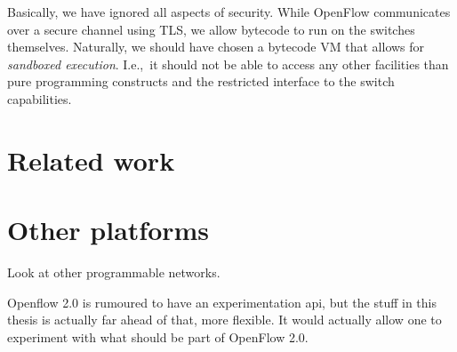 Basically, we have ignored all aspects of security.  While OpenFlow
communicates over a secure channel using \ac{TLS}, we allow bytecode to run
on the switches themselves.  Naturally, we should have chosen a bytecode
\acs{VM} that allows for \textit{sandboxed execution}.  I.e.,~it should not
be able to access any other facilities than pure programming constructs and
the restricted interface to the switch capabilities.


\section{Related work}


\section{Other platforms}

Look at other programmable networks.

Openflow 2.0 is rumoured to have an experimentation api, but the stuff in
this thesis is actually far ahead of that, more flexible.
It would actually allow one to experiment with what should be part of
OpenFlow 2.0.
